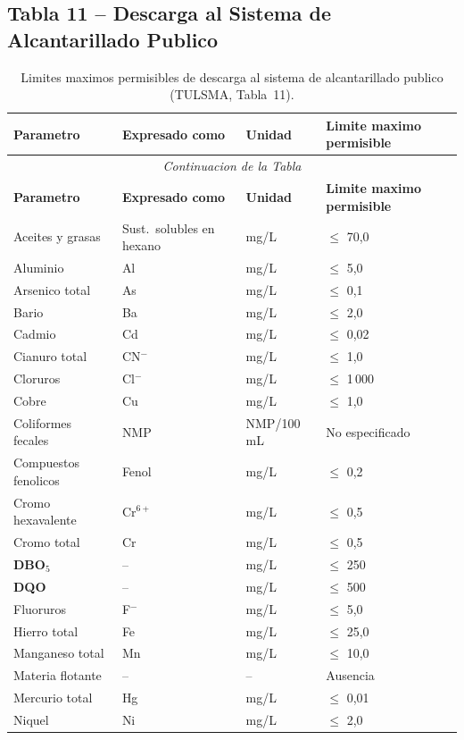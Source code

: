 \documentclass[12pt,a4paper]{article}
\begin{document}
\subsection{Tabla 11 -- Descarga al Sistema de Alcantarillado Publico}
\small
\begin{longtable}{p{4.5cm}p{2.0cm}p{2.0cm}p{3.5cm}}
\caption{Limites maximos permisibles de descarga al sistema de alcantarillado publico (TULSMA, Tabla~11).}\\
\toprule
\textbf{Parametro} & \textbf{Expresado como} & \textbf{Unidad} & \textbf{Limite maximo permisible} \\
\midrule
\endfirsthead
\multicolumn{4}{c}{\small\itshape Continuacion de la Tabla}\\
\toprule
\textbf{Parametro} & \textbf{Expresado como} & \textbf{Unidad} & \textbf{Limite maximo permisible} \\
\midrule
\endhead
\bottomrule
\endlastfoot
Aceites y grasas & Sust.\ solubles en hexano & mg/L & $\leq$ 70,0 \\
Aluminio & Al & mg/L & $\leq$ 5,0 \\
Arsenico total & As & mg/L & $\leq$ 0,1 \\
Bario & Ba & mg/L & $\leq$ 2,0 \\
Cadmio & Cd & mg/L & $\leq$ 0,02 \\
Cianuro total & CN$^-$ & mg/L & $\leq$ 1,0 \\
Cloruros & Cl$^-$ & mg/L & $\leq$ 1\,000 \\
Cobre & Cu & mg/L & $\leq$ 1,0 \\
Coliformes fecales & NMP & NMP/100 mL & No especificado \\
Compuestos fenolicos & Fenol & mg/L & $\leq$ 0,2 \\
Cromo hexavalente & Cr$^{6+}$ & mg/L & $\leq$ 0,5 \\
Cromo total & Cr & mg/L & $\leq$ 0,5 \\
\textbf{DBO$_5$} & -- & mg/L & $\leq$ 250 \\
\textbf{DQO} & -- & mg/L & $\leq$ 500 \\
Fluoruros & F$^-$ & mg/L & $\leq$ 5,0 \\
Hierro total & Fe & mg/L & $\leq$ 25,0 \\
Manganeso total & Mn & mg/L & $\leq$ 10,0 \\
Materia flotante & -- & -- & Ausencia \\
Mercurio total & Hg & mg/L & $\leq$ 0,01 \\
Niquel & Ni & mg/L & $\leq$ 2,0 \\

\end{longtable}
\end{document}
